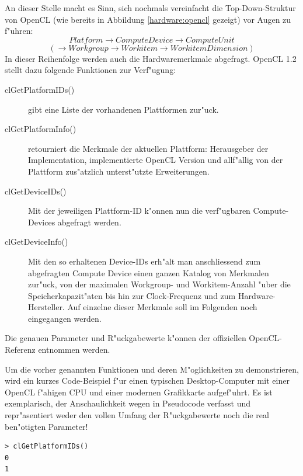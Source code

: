 \begin{refsection}
An dieser Stelle macht es Sinn, sich nochmals vereinfacht die Top-Down-Struktur
von OpenCL (wie bereits in Abbildung \ref{hardware:opencl} gezeigt) vor Augen zu
f"uhren:
\[
	Platform \rightarrow Compute Device \rightarrow Compute Unit
\]\[
	(\rightarrow Workgroup \rightarrow Workitem \rightarrow Workitem Dimension)
\]
\noindent In dieser Reihenfolge werden auch die Hardwaremerkmale abgefragt.
OpenCL 1.2 stellt dazu folgende Funktionen zur Verf"ugung:

\begin{description}
 \item [clGetPlatformIDs()] gibt eine Liste der vorhandenen Plattformen zur"uck.
 \item [clGetPlatformInfo()] retourniert die Merkmale der aktuellen Plattform:
                            Herausgeber der Implementation, implementierte 
                            OpenCL Version und allf"allig von der Plattform 
                            zus"atzlich unterst"utzte Erweiterungen.
 \item [clGetDeviceIDs()]   Mit der jeweiligen Plattform-ID k"onnen nun die
                            verf"ugbaren Compute-Devices abgefragt werden.
 \item [clGetDeviceInfo()]  Mit den so erhaltenen Device-IDs erh"alt man anschliessend 
                            zum abgefragten Compute Device einen ganzen Katalog von
                            Merkmalen zur"uck, von der maximalen
                            Workgroup- und Workitem-Anzahl "uber die
                            Speicherkapazit"aten bis hin zur
                            Clock-Frequenz und zum Hardware-Hersteller. Auf einzelne
                            dieser Merkmale soll im Folgenden noch eingegangen werden.
\end{description}

\noindent Die genauen Parameter und R"uckgabewerte k"onnen der offiziellen
OpenCL-Referenz\cite{crypto:opencl_ref} entnommen werden.

Um die vorher genannten Funktionen und deren M"oglichkeiten zu demonstrieren, wird ein kurzes
Code-Beispiel f"ur einen typischen Desktop-Computer mit einer OpenCL f"ahigen
CPU und einer modernen Grafikkarte aufgef"uhrt. Es ist exemplarisch, der
Anschaulichkeit wegen in Pseudocode verfasst und repr"asentiert weder den vollen
Umfang der R"uckgabewerte noch die real ben"otigten Parameter!

\begin{small}
\begin{verbatim}
> clGetPlatformIDs()
0
1


\end{verbatim}
\end{small}
\end{refsection}
